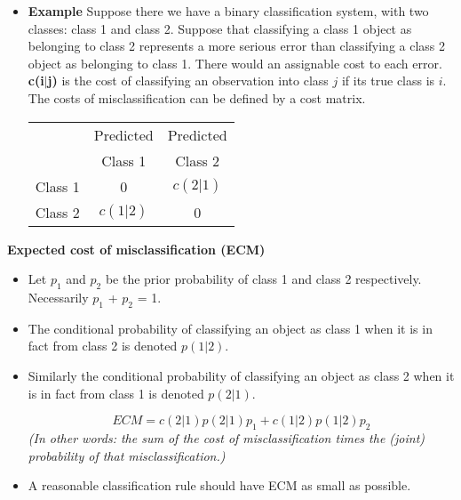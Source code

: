 \documentclass[]{report}
\begin{document}
\begin{itemize}
	\item 	\textbf{Example} Suppose there we have a binary classification system, with two classes: class 1 and class 2.
	Suppose that classifying a class 1 object as belonging to class 2 represents a more serious error than classifying a class 2 object as belonging to class 1. There would an assignable cost to each error.
	\textbf{c(i$|$j)} is the cost of classifying an observation into class $j$ if its true class is $i$.
	The costs of misclassification can be defined by a cost matrix.
	
	\begin{center}
	\begin{tabular}{|c|c|c|}
		\hline
		& Predicted & Predicted \\
		& Class 1 & Class 2 \\  \hline
		Class 1 & 0 & $c(2|1)$  \\ \hline
		Class 2 & $c(1|2)$ & 0 \\
		\hline
	\end{tabular}
	\end{center}
	
\end{itemize}

\noindent \textbf{Expected cost of misclassification (ECM)}
\begin{itemize}
	\item Let $p_1$ and $p_2$ be the prior probability of class 1 and class 2 respectively.
	Necessarily $p_1$ + $p_2$ = 1.
	
\item	The conditional probability of classifying an object as class 1 when it is in fact from
	class 2 is denoted $p(1|2)$.
\item 	Similarly the conditional probability of classifying an object as class 2 when it is in
	fact from class 1 is denoted $p(2|1)$.
	
	\[ECM = c(2|1)p(2|1)p_1 + c(1|2)p(1|2)p_2\]
\textit{(In other words: the sum of the cost of misclassification times the (joint) probability of that misclassification.)}
	
\item 	A reasonable classification rule should have ECM as small as possible.
\end{itemize}
\end{document}

